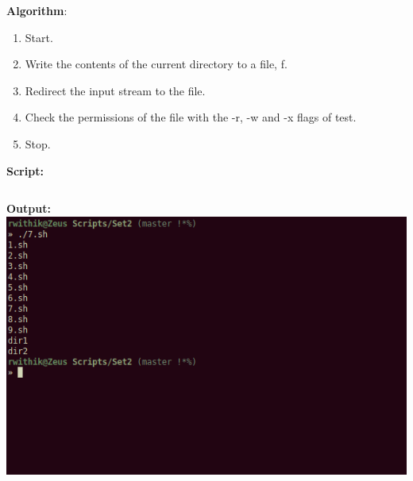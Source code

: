 \documentclass[10pt,a4paper,titlepage]{report}
\begin{document}
\begin{enumerate}
\textbf{Algorithm}:\newline
\begin{enumerate}
	\item Start.
	\item Write the contents of the current directory to a file, f.
	\item Redirect the input stream to the file.
	\item Check the permissions of the file with the {\color{red}-r}, {\color{red}-w} and {\color{red}-x} flags of {\color{red}test}.
	\item Stop.
\end{enumerate}
\newline
\textbf{Script:}\newline
\inputminted{bash}{../Scripts/Set2/7.sh}
\newline
\textbf{Output:}\newline
\includegraphics[width=\linewidth]{../Images/Shell2/7.png}
\pagebreak


\end{enumerate}
\end{document}
